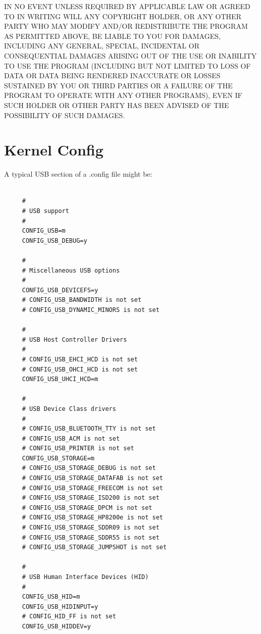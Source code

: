 {{{{{{{{{{{{{{{{{IN NO EVENT UNLESS REQUIRED BY APPLICABLE LAW OR AGREED TO IN WRITING WILL ANY
COPYRIGHT HOLDER, OR ANY OTHER PARTY WHO MAY MODIFY AND/OR REDISTRIBUTE THE
PROGRAM AS PERMITTED ABOVE, BE LIABLE TO YOU FOR DAMAGES, INCLUDING ANY
GENERAL, SPECIAL, INCIDENTAL OR CONSEQUENTIAL DAMAGES ARISING OUT OF THE USE
OR INABILITY TO USE THE PROGRAM (INCLUDING BUT NOT LIMITED TO LOSS OF DATA OR
DATA BEING RENDERED INACCURATE OR LOSSES SUSTAINED BY YOU OR THIRD PARTIES OR
A FAILURE OF THE PROGRAM TO OPERATE WITH ANY OTHER PROGRAMS), EVEN IF SUCH
HOLDER OR OTHER PARTY HAS BEEN ADVISED OF THE POSSIBILITY OF SUCH DAMAGES. 

\label{Kernel-Config}

\section*{Kernel Config}

A typical USB section of a .config file might be:  

\label{index-Kernel-config-265}
\label{index-config_002c-Kernel-266}

\footnotesize
\begin{verbatim}
     
     #
     # USB support
     #
     CONFIG_USB=m
     CONFIG_USB_DEBUG=y
     
     #
     # Miscellaneous USB options
     #
     CONFIG_USB_DEVICEFS=y
     # CONFIG_USB_BANDWIDTH is not set
     # CONFIG_USB_DYNAMIC_MINORS is not set
     
     #
     # USB Host Controller Drivers
     #
     # CONFIG_USB_EHCI_HCD is not set
     # CONFIG_USB_OHCI_HCD is not set
     CONFIG_USB_UHCI_HCD=m
     
     #
     # USB Device Class drivers
     #
     # CONFIG_USB_BLUETOOTH_TTY is not set
     # CONFIG_USB_ACM is not set
     # CONFIG_USB_PRINTER is not set
     CONFIG_USB_STORAGE=m
     # CONFIG_USB_STORAGE_DEBUG is not set
     # CONFIG_USB_STORAGE_DATAFAB is not set
     # CONFIG_USB_STORAGE_FREECOM is not set
     # CONFIG_USB_STORAGE_ISD200 is not set
     # CONFIG_USB_STORAGE_DPCM is not set
     # CONFIG_USB_STORAGE_HP8200e is not set
     # CONFIG_USB_STORAGE_SDDR09 is not set
     # CONFIG_USB_STORAGE_SDDR55 is not set
     # CONFIG_USB_STORAGE_JUMPSHOT is not set
     
     #
     # USB Human Interface Devices (HID)
     #
     CONFIG_USB_HID=m
     CONFIG_USB_HIDINPUT=y
     # CONFIG_HID_FF is not set
     CONFIG_USB_HIDDEV=y
     

\end{verbatim}}}}}}}}}}}}}}}}}}

